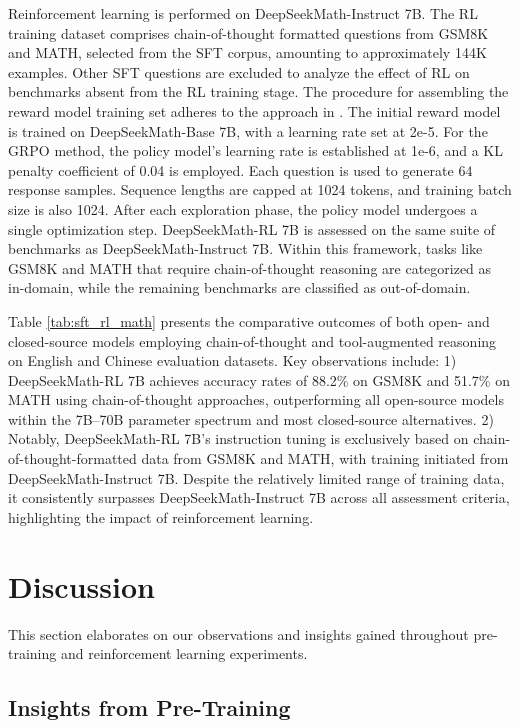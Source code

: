 Reinforcement learning is performed on DeepSeekMath-Instruct 7B. The RL training dataset comprises chain-of-thought formatted questions from GSM8K and MATH, selected from the SFT corpus, amounting to approximately 144K examples. Other SFT questions are excluded to analyze the effect of RL on benchmarks absent from the RL training stage. The procedure for assembling the reward model training set adheres to the approach in \citep{wang2023math}. The initial reward model is trained on DeepSeekMath-Base 7B, with a learning rate set at 2e-5. For the GRPO method, the policy model’s learning rate is established at 1e-6, and a KL penalty coefficient of 0.04 is employed. Each question is used to generate $64$ response samples. Sequence lengths are capped at 1024 tokens, and training batch size is also 1024. After each exploration phase, the policy model undergoes a single optimization step. DeepSeekMath-RL 7B is assessed on the same suite of benchmarks as DeepSeekMath-Instruct 7B. Within this framework, tasks like GSM8K and MATH that require chain-of-thought reasoning are categorized as in-domain, while the remaining benchmarks are classified as out-of-domain.

Table \ref{tab:sft_rl_math} presents the comparative outcomes of both open- and closed-source models employing chain-of-thought and tool-augmented reasoning on English and Chinese evaluation datasets. Key observations include: 1) DeepSeekMath-RL 7B achieves accuracy rates of 88.2\% on GSM8K and 51.7\% on MATH using chain-of-thought approaches, outperforming all open-source models within the 7B–70B parameter spectrum and most closed-source alternatives. 2) Notably, DeepSeekMath-RL 7B's instruction tuning is exclusively based on chain-of-thought-formatted data from GSM8K and MATH, with training initiated from DeepSeekMath-Instruct 7B. Despite the relatively limited range of training data, it consistently surpasses DeepSeekMath-Instruct 7B across all assessment criteria, highlighting the impact of reinforcement learning.

\section{Discussion}
This section elaborates on our observations and insights gained throughout pre-training and reinforcement learning experiments.

\subsection{Insights from Pre-Training}

